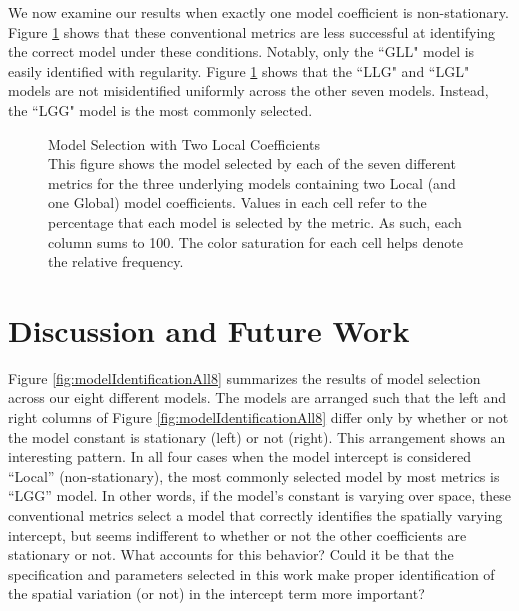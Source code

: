 \documentclass{article}\usepackage[]{graphicx}\usepackage[]{color}
\begin{document}
We now examine our results when exactly one model coefficient is non-stationary. Figure \ref{fig:modelIdentificationOneG} shows that these conventional metrics are less successful at identifying the correct model under these conditions. Notably, only the ``GLL" model is easily identified with regularity. Figure \ref{fig:modelIdentificationOneG} shows that the ``LLG" and ``LGL" models are not misidentified uniformly across the other seven models. Instead, the ``LGG" model is the most commonly selected.



\begin{figure}
\caption{Model Selection with Two Local Coefficients \\ This figure shows the model selected by each of the seven different metrics for the three underlying models containing two Local (and one Global) model coefficients. Values in each cell refer to the percentage that each model is selected by the metric. As such, each column sums to 100. The color saturation for each cell helps denote the relative frequency.}
\label{fig:modelIdentificationOneG}
\end{figure}

\section{Discussion and Future Work}

Figure \ref{fig:modelIdentificationAll8} summarizes the results of model selection across our eight different models. The models are arranged such that the left and right columns of Figure \ref{fig:modelIdentificationAll8} differ only by whether or not the model constant is stationary (left) or not (right). This arrangement shows an interesting pattern. In all four cases when the model intercept is considered ``Local'' (non-stationary), the most commonly selected model by most metrics is ``LGG'' model. In other words, if the model's constant is varying over space, these conventional metrics select a model that correctly identifies the spatially varying intercept, but seems indifferent to whether or not the other coefficients are stationary or not. What accounts for this behavior? Could it be that the specification and parameters selected in this work make proper identification of the spatial variation (or not) in the intercept term more important? 
\end{document}
